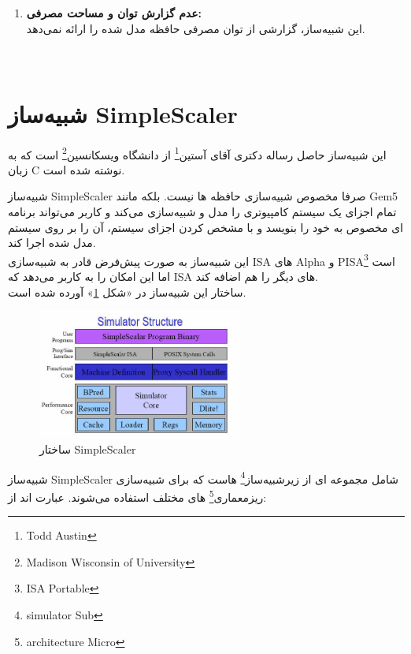 \documentclass[12pt]{exam}
\begin{document}
\begin{questions}
\begin{enumerate}
	\item \textbf{عدم گزارش توان و مساحت مصرفی: }\\
	این شبیه‌ساز، گزارشی از توان مصرفی حافظه مدل شده را ارائه نمی‌دهد. \\ \\ \\

\end{enumerate}



\section{شبیه‌ساز SimpleScaler}
این شبیه‌ساز حاصل رساله دکتری آقای آستین\footnote{Todd Austin} از دانشگاه ویسکانسین\footnote{Madison Wisconsin of University} است که به زبان C نوشته شده است.

شبیه‌ساز SimpleScaler صرفا مخصوص شبیه‌سازی حافظه ها نیست. بلکه مانند Gem5 تمام اجزای یک سیستم کامپیوتری را مدل و شبیه‌سازی می‌کند و کاربر می‌تواند برنامه ای مخصوص به خود را بنویسد و با مشخص کردن اجزای سیستم، آن را بر روی سیستم مدل شده اجرا کند. \\

این شبیه‌ساز به صورت پیش‌فرض قادر به شبیه‌سازی ISA های Alpha و PISA\footnote{ISA Portable} است اما این امکان را به کاربر می‌دهد که ISA های دیگر را هم اضافه کند. \\

ساختار این شبیه‌ساز در «شکل \textcolor{blue}{\ref{ساختار SimpleScaler}}» آورده شده است.


\begin{figure}[h]
	\centering
	\includegraphics[width=0.6\textwidth]{images/img16}
	\caption{ساختار SimpleScaler}
	\label{ساختار SimpleScaler}
\end{figure}


شبیه‌ساز SimpleScaler شامل مجموعه ای از زیرشبیه‌ساز\footnote{simulator Sub} هاست که برای شبیه‌سازی ریزمعماری\footnote{architecture Micro} های مختلف استفاده می‌شوند. عبارت اند از:


\end{questions}
\end{document}
